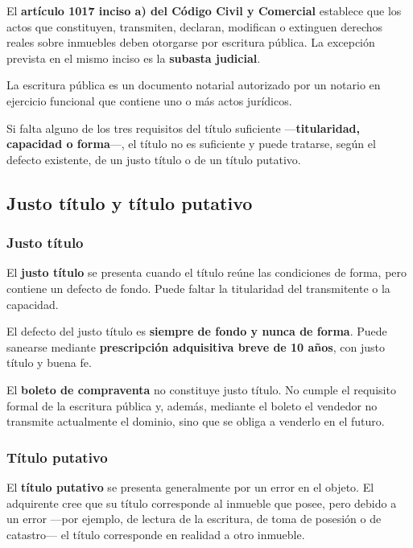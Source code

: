 \documentclass[12pt,oneside]{book}
\begin{document}
\begin{important}
El \textbf{artículo 1017 inciso a) del Código Civil y Comercial} establece que los actos que constituyen, transmiten, declaran, modifican o extinguen derechos reales sobre inmuebles deben otorgarse por escritura pública. La excepción prevista en el mismo inciso es la \textbf{subasta judicial}.
\end{important}

La escritura pública es un documento notarial autorizado por un notario en ejercicio funcional que contiene uno o más actos jurídicos.

Si falta alguno de los tres requisitos del título suficiente ---\textbf{titularidad, capacidad o forma}---, el título no es suficiente y puede tratarse, según el defecto existente, de un justo título o de un título putativo.

\subsection{Justo título y título putativo}

\subsubsection{Justo título}

El \textbf{justo título} se presenta cuando el título reúne las condiciones de forma, pero contiene un defecto de fondo. Puede faltar la titularidad del transmitente o la capacidad.

El defecto del justo título es \textbf{siempre de fondo y nunca de forma}. Puede sanearse mediante \textbf{prescripción adquisitiva breve de 10 años}, con justo título y buena fe.

\begin{important}
El \textbf{boleto de compraventa} no constituye justo título. No cumple el requisito formal de la escritura pública y, además, mediante el boleto el vendedor no transmite actualmente el dominio, sino que se obliga a venderlo en el futuro.
\end{important}

\subsubsection{Título putativo}

El \textbf{título putativo} se presenta generalmente por un error en el objeto. El adquirente cree que su título corresponde al inmueble que posee, pero debido a un error ---por ejemplo, de lectura de la escritura, de toma de posesión o de catastro--- el título corresponde en realidad a otro inmueble.
\end{document}
